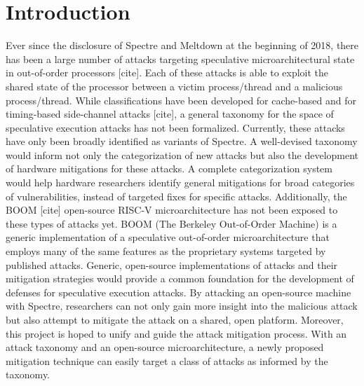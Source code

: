 \section{Introduction}

Ever since the disclosure of Spectre and Meltdown at the beginning of 2018, there has
been a large number of attacks targeting speculative microarchitectural state in
out-of-order processors [cite]. Each of these attacks is able to exploit the shared
state of the processor between a victim process/thread and a malicious process/thread.
While classifications have been developed for cache-based and for timing-based 
side-channel attacks [cite], a general taxonomy for the space of speculative execution
attacks has not been formalized. Currently, these attacks have only been broadly 
identified as variants of Spectre. A well-devised taxonomy would inform not only the 
categorization of new attacks but also the development of hardware mitigations for 
these attacks. A complete categorization system would help hardware researchers 
identify general mitigations for broad categories of vulnerabilities, instead of 
targeted fixes for specific attacks. Additionally, the BOOM [cite] open-source RISC-V
microarchitecture has not been exposed to these types of attacks yet. BOOM (The
Berkeley Out-of-Order Machine) is a generic implementation of a speculative 
out-of-order microarchitecture that employs many of the same features as the 
proprietary systems targeted by published attacks. Generic, open-source 
implementations of attacks and their mitigation strategies would provide a common 
foundation for the development of defenses for speculative execution attacks.
By attacking an open-source machine with Spectre, researchers can not only gain more 
insight into the malicious attack but also attempt to mitigate the attack on a shared,
open platform. Moreover, this project is hoped to unify and guide the attack 
mitigation process. With an attack taxonomy and an open-source microarchitecture, a 
newly proposed mitigation technique can easily target a class of attacks as informed 
by the taxonomy.

